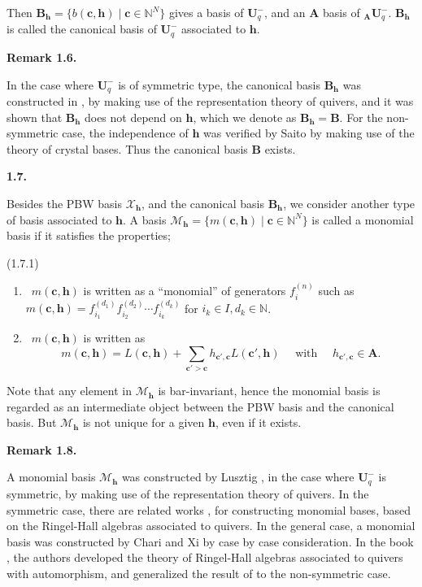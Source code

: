 \documentclass[12pt]{amsart}
\renewcommand{\1}{\mathbb 1}
\newcommand{\NN}{\mathbb N}
\newcommand\BA{\mathbf A}
\newcommand\bB{\mathbf B}
\newcommand\BU{\mathbf U}
\newcommand\Bh{\mathbf h}
\newcommand\Bc{\mathbf c}
\newcommand\SM{\mathscr{M}}
\newcommand\SX{\mathscr{X}}
\numberwithin{equation}{section}
\def \para#1{\par\medskip\textbf{#1}
              \addtocounter{thm}{1}}
\def \remark#1{\par\medskip\noindent
                \textbf{Remark #1}
                \addtocounter{thm}{1}}
\begin{document}
\par\medskip
Then $\bB_{\Bh} = \{ b(\Bc,\Bh) \mid \Bc \in \NN^N\}$ gives a basis of $\BU_q^-$,
and an $\BA$ basis of ${}_{\BA}\BU_q^-$.
$\bB_{\Bh}$ is called the canonical basis of $\BU_q^-$ associated to $\Bh$.

\remark{1.6.}
In the case where $\BU_q^-$ is of symmetric type,
the canonical basis $\bB_{\Bh}$ was constructed in \cite{L-can}, by making use of
the representation theory of quivers, and it was shown that $\bB_{\Bh}$
does not depend on $\Bh$, which
we denote as $\bB_{\Bh} = \bB$.  For the non-symmetric case, 
the independence of $\Bh$ was verified by Saito \cite{S} by making use of the theory
of crystal bases. Thus the canonical basis $\bB$ exists. 

\para{1.7.}
Besides the PBW basis $\SX_{\Bh}$, and the canonical basis $\bB_{\Bh}$,
we consider another type of basis associated to $\Bh$.
A basis $\SM_{\Bh} = \{ m(\Bc, \Bh) \mid \Bc \in \NN^N\}$
is called a monomial basis if it satisfies the properties;
\par\medskip\noindent
(1.7.1)
\begin{enumerate}
\item   \ $m(\Bc,\Bh)$ is written as a ``monomial'' of generators $f_i^{(n)}$
such as $m(\Bc,\Bh) = f_{i_1}^{(d_1)}f_{i_2}^{(d_2)}\cdots f_{i_k}^{(d_k)}$
for $i_k \in I, d_k \in \NN$.
\item  \ $m(\Bc,\Bh)$ is written as
\begin{equation*}
  m(\Bc,\Bh) = L(\Bc,\Bh) + \sum_{\Bc' > \Bc}h_{\Bc',\Bc}L(\Bc',\Bh)
                    \quad\text{ with }\quad h_{\Bc',\Bc} \in \BA. 
\end{equation*}  
\end{enumerate}
Note that any element in $\SM_{\Bh}$ is bar-invariant, hence
the monomial basis is regarded as an intermediate object between the PBW basis and
the canonical basis.  But $\SM_{\Bh}$ is not unique for a given $\Bh$, even if it exists. 

\remark{1.8.}
A monomial basis $\SM_{\Bh}$ was constructed by Lusztig \cite{L-can}, in the case
where $\BU_q^-$ is symmetric, by making use of the representation theory of
quivers.  In the symmetric case, there are related works \cite{DD}, \cite{Re}
for constructing monomial bases, based on the Ringel-Hall algebras associated to quivers. 
In the general case, a monomial basis was constructed by
Chari and Xi \cite{CX} by case by case consideration.
In the book \cite{DDPW}, the authors developed the theory of Ringel-Hall algebras
associated to quivers with automorphism, and generalized the result of
\cite{DD} to the non-symmetric case. 
\end{document}
